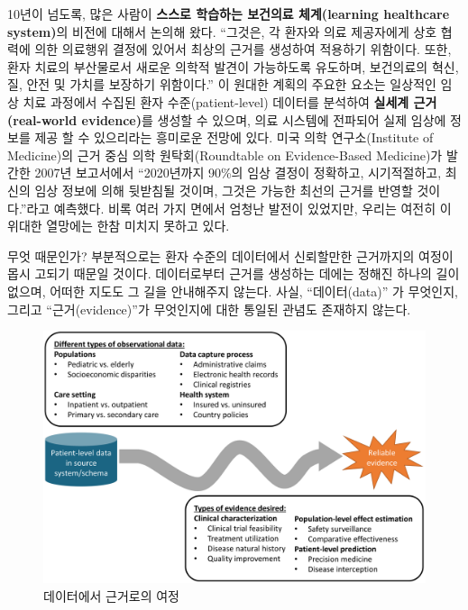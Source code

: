 \documentclass[11pt]{book}
\theoremstyle{definition}
\theoremstyle{definition}
\theoremstyle{definition}
\theoremstyle{remark}
\begin{document}
10년이 넘도록, 많은 사람이 \textbf{스스로 학습하는 보건의료
체계(learning healthcare system)}의 비전에 대해서 논의해 왔다. ``그것은,
각 환자와 의료 제공자에게 상호 협력에 의한 의료행위 결정에 있어서 최상의
근거를 생성하여 적용하기 위함이다. 또한, 환자 치료의 부산물로서 새로운
의학적 발견이 가능하도록 유도하며, 보건의료의 혁신, 질, 안전 및 가치를
보장하기 위함이다.'' \citep{olsen2007learning} 이 원대한 계획의 주요한
요소는 일상적인 임상 치료 과정에서 수집된 환자 수준(patient-level)
데이터를 분석하여 \textbf{실세계 근거(real-world evidence)}를 생성할 수
있으며, 의료 시스템에 전파되어 실제 임상에 정보를 제공 할 수 있으리라는
흥미로운 전망에 있다. 미국 의학 연구소(Institute of Medicine)의 근거
중심 의학 원탁회(Roundtable on Evidence-Based Medicine)가 발간한 2007년
보고서에서 ``2020년까지 90\%의 임상 결정이 정확하고, 시기적절하고,
최신의 임상 정보에 의해 뒷받침될 것이며, 그것은 가능한 최선의 근거를
반영할 것이다.''라고 예측했다. \citep{olsen2007learning} 비록 여러 가지
면에서 엄청난 발전이 있었지만, 우리는 여전히 이 위대한 열망에는 한참
미치지 못하고 있다.

무엇 때문인가? 부분적으로는 환자 수준의 데이터에서 신뢰할만한 근거까지의
여정이 몹시 고되기 때문일 것이다. 데이터로부터 근거를 생성하는 데에는
정해진 하나의 길이 없으며, 어떠한 지도도 그 길을 안내해주지 않는다.
사실, ``데이터(data)'' 가 무엇인지, 그리고 ``근거(evidence)''가
무엇인지에 대한 통일된 관념도 존재하지 않는다.

\begin{figure}

{\centering \includegraphics[width=1\linewidth]{images/OhdsiCommunity/datajourney} 

}

\caption{데이터에서 근거로의 여정}\label{fig:datajourney}
\end{figure}
\end{document}
